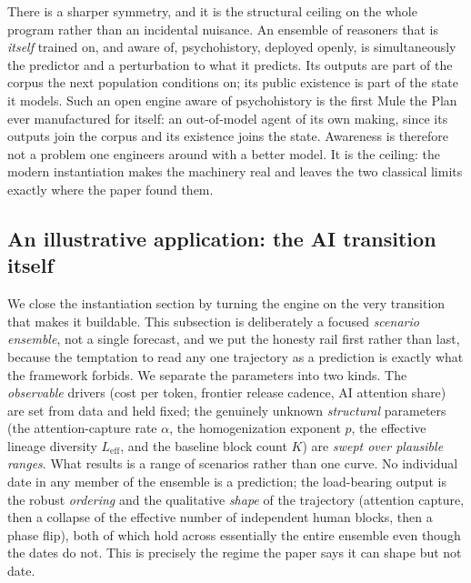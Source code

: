 \documentclass[11pt]{article}
\begin{document}
There is a sharper symmetry, and it is the structural ceiling on the whole program rather than an incidental nuisance. An ensemble of reasoners that is \emph{itself} trained on, and aware of, psychohistory, deployed openly, is simultaneously the predictor and a perturbation to what it predicts. Its outputs are part of the corpus the next population conditions on; its public existence is part of the state it models. Such an open engine aware of psychohistory is the first Mule the Plan ever manufactured for itself: an out-of-model agent of its own making, since its outputs join the corpus and its existence joins the state. Awareness is therefore not a problem one engineers around with a better model. It is the ceiling: the modern instantiation makes the machinery real and leaves the two classical limits exactly where the paper found them.

\subsection{An illustrative application: the AI transition itself}
\label{sec:mythosfable}

We close the instantiation section by turning the engine on the very transition that makes it buildable. This subsection is deliberately a focused \emph{scenario ensemble}, not a single forecast, and we put the honesty rail first rather than last, because the temptation to read any one trajectory as a prediction is exactly what the framework forbids. We separate the parameters into two kinds. The \emph{observable} drivers (cost per token, frontier release cadence, AI attention share) are set from data and held fixed; the genuinely unknown \emph{structural} parameters (the attention-capture rate $\alpha$, the homogenization exponent $p$, the effective lineage diversity $L_{\mathrm{eff}}$, and the baseline block count $K$) are \emph{swept over plausible ranges}. What results is a range of scenarios rather than one curve. No individual date in any member of the ensemble is a prediction; the load-bearing output is the robust \emph{ordering} and the qualitative \emph{shape} of the trajectory (attention capture, then a collapse of the effective number of independent human blocks, then a phase flip), both of which hold across essentially the entire ensemble even though the dates do not. This is precisely the regime the paper says it can shape but not date.
\end{document}
